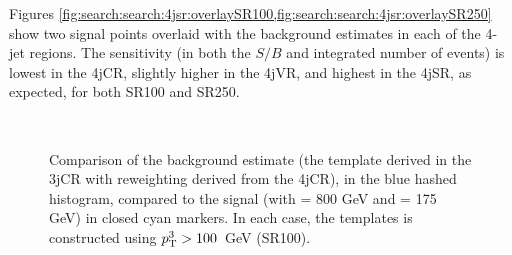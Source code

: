 Figures \ref{fig:search:search:4jsr:overlaySR100,fig:search:search:4jsr:overlaySR250} show two signal points overlaid with the background estimates in each of the 4-jet regions. The sensitivity (in both the $S/B$ and integrated number of events) is lowest in the 4jCR, slightly higher in the 4jVR, and highest in the 4jSR, as expected, for both SR100 and SR250.


\begin{figure}[!ht]
  \centering
  
  \\
    
  \caption{Comparison of the background estimate (the template derived in the 3jCR with reweighting derived from the 4jCR), in the blue hashed histogram, compared to the signal (with \mgluino = 800 GeV and \mchi = 175 GeV) in closed cyan markers. In each case, the \MJ templates is constructed using $p_{\text{T}}^{3}>100$~GeV (SR100).}
               
  \label{fig:search:search:4jsr:overlaySR100}
\end{figure}

